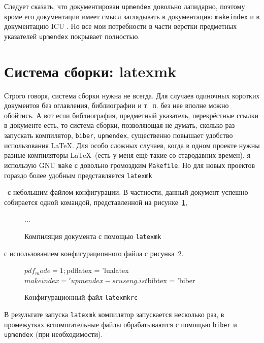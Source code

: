 \documentclass[a4paper,12pt,hyphens]{article}
\newcommand\exe[1]{\texttt{#1}}
\newcommand\file[1]{\texttt{#1}}
\begin{document}
Следует сказать, что документирован \exe{upmendex} довольно лапидарно, поэтому кроме его документации имеет смысл заглядывать в документацию \exe{makeindex} и в документацию ICU \parencite{site-icu-docs}.
Но все мои потребности в части верстки предметных указателей \exe{upmendex} покрывает полностью.

\section{Система сборки: latexmk}
Строго говоря, система сборки нужна не всегда. Для случаев одиночных коротких
документов без оглавления, библиографии и т.~п. без нее вполне можно
обойтись. А вот если библиография, предметный указатель, перекрёстные
ссылки в документе есть, то система сборки, позволяющая не думать, сколько
раз запускать компилятор, \exe{biber}, \exe{upmendex}, существенно
повышает удобство использования \LaTeX. Для особо сложных случаев, когда
в одном проекте нужны разные компиляторы \LaTeX\ (есть у меня ещё такие со
стародавних времен), я использую GNU \exe{make} \parencite{site-make}
с довольно громоздким \file{Makefile}. Но для новых проектов гораздо
более удобным представляется
\exe{latexmk} \begin{otherlanguage}{english}\parencite{ctan-latexmk}\end{otherlanguage}\
с небольшим файлом конфигурации. В частности, данный документ успешно
собирается одной командой, представленной на рисунке~\ref{latexmk1},
\begin{figure}[tp]
\begin{shcode}

...

%
\end{shcode}
\caption{Компиляция документа с помощью \exe{latexmk}}\label{latexmk1}
\end{figure}
с использованием конфигурационного файла с рисунка~\ref{latexmk2}.
\begin{figure}[tp]
\begin{latexmkcode}
$pdf_mode = 1;
$pdflatex = 'lualatex %
$makeindex = 'upmendex -s ruseng.ist %
$bibtex = 'biber %
\end{latexmkcode}
\caption{Конфигурационный файл \file{latexmkrc}}\label{latexmk2}
\end{figure}
В результате запуска \exe{latexmk} компилятор запускается несколько раз,
в промежутках вспомогательные файлы обрабатываются с помощью \exe{biber}
и \exe{upmendex} (при необходимости).
\end{document}

